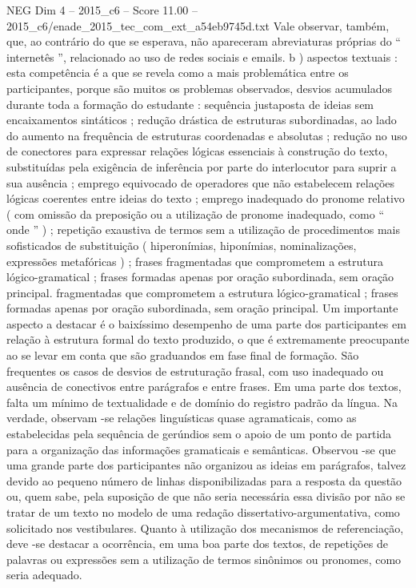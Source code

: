 \begin{textsample}{NEG Dim 4 – 2015\_c6 – Score 11.00 – 2015\_c6/enade\_2015\_tec\_com\_ext\_a54eb9745d.txt}
Vale observar, também, que, ao contrário do que se esperava, não apareceram abreviaturas próprias do “ internetês ”, relacionado ao uso de redes sociais e emails. b ) aspectos textuais : esta competência é a que se revela como a mais problemática entre os participantes, porque são muitos os problemas observados, desvios acumulados durante toda a formação do estudante : sequência justaposta de ideias sem encaixamentos sintáticos ; redução drástica de estruturas subordinadas, ao lado do aumento na frequência de estruturas coordenadas e absolutas ; redução no uso de conectores para expressar relações lógicas essenciais à construção do texto, substituídas pela exigência de inferência por parte do interlocutor para suprir a sua ausência ; emprego equivocado de operadores que não estabelecem relações lógicas coerentes entre ideias do texto ; emprego inadequado do pronome relativo ( com omissão da preposição ou a utilização de pronome inadequado, como “ onde ” ) ; repetição exaustiva de termos sem a utilização de procedimentos mais sofisticados de substituição ( hiperonímias, hiponímias, nominalizações, expressões metafóricas ) ; frases fragmentadas que comprometem a estrutura lógico-gramatical ; frases formadas apenas por oração subordinada, sem oração principal. fragmentadas que comprometem a estrutura lógico-gramatical ; frases formadas apenas por oração subordinada, sem oração principal.
Um importante aspecto a destacar é o baixíssimo desempenho de uma parte dos participantes em relação à estrutura formal do texto produzido, o que é extremamente preocupante ao se levar em conta que são graduandos em fase final de formação.
São frequentes os casos de desvios de estruturação frasal, com uso inadequado ou ausência de conectivos entre parágrafos e entre frases.
Em uma parte dos textos, falta um mínimo de textualidade e de domínio do registro padrão da língua.
Na verdade, observam -se relações linguísticas quase agramaticais, como as estabelecidas pela sequência de gerúndios sem o apoio de um ponto de partida para a organização das informações gramaticais e semânticas.
Observou -se que uma grande parte dos participantes não organizou as ideias em parágrafos, talvez devido ao pequeno número de linhas disponibilizadas para a resposta da questão ou, quem sabe, pela suposição de que não seria necessária essa divisão por não se tratar de um texto no modelo de uma redação dissertativo-argumentativa, como solicitado nos vestibulares.
Quanto à utilização dos mecanismos de referenciação, deve -se destacar a ocorrência, em uma boa parte dos textos, de repetições de palavras ou expressões sem a utilização de termos sinônimos ou pronomes, como seria adequado.

\end{textsample}
